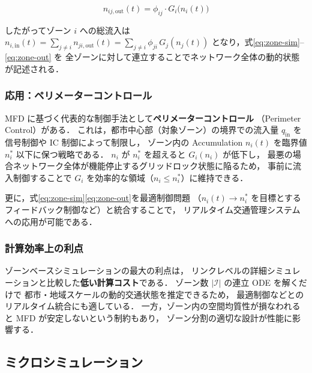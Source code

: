 \begin{equation}
  n_{ij,\text{out}}(t) = \phi_{ij} \cdot G_i\bigl(n_i(t)\bigr)
  \label{eq:zone-out}
\end{equation}

したがってゾーン $i$ への総流入は
$n_{i,\text{in}}(t) = \sum_{j \neq i} n_{ji,\text{out}}(t)
  = \sum_{j \neq i} \phi_{ji}\, G_j(n_j(t))$
となり，式\eqref{eq:zone-sim}--\eqref{eq:zone-out} を
全ゾーンに対して連立することでネットワーク全体の動的状態が記述される．

\subsubsection*{応用：ペリメーターコントロール}

MFD に基づく代表的な制御手法として\textbf{ペリメーターコントロール}
（Perimeter Control）がある\cite{Daganzo2007}．
これは，都市中心部（対象ゾーン）の境界での流入量 $q_{\text{in}}$ を
信号制御や IC 制御によって制限し，
ゾーン内の Accumulation $n_i(t)$ を臨界値 $n_i^*$ 以下に保つ戦略である．
$n_i$ が $n_i^*$ を超えると $G_i(n_i)$ が低下し，
最悪の場合ネットワーク全体が機能停止するグリッドロック状態に陥るため，
事前に流入制御することで $G_i$ を効率的な領域（$n_i \leq n_i^*$）に維持できる．

更に，式\eqref{eq:zone-sim}\eqref{eq:zone-out}を最適制御問題
（$n_i(t) \to n_i^*$ を目標とするフィードバック制御など）と統合することで，
リアルタイム交通管理システムへの応用が可能である．

\subsubsection*{計算効率上の利点}

ゾーンベースシミュレーションの最大の利点は，
リンクレベルの詳細シミュレーションと比較した\textbf{低い計算コスト}である．
ゾーン数 $|\mathcal{I}|$ の連立 ODE を解くだけで
都市・地域スケールの動的交通状態を推定できるため，
最適制御などとのリアルタイム統合にも適している．
一方，ゾーン内の空間均質性が損なわれると MFD が安定しないという制約もあり，
ゾーン分割の適切な設計が性能に影響する．

\subsection{ミクロシミュレーション}
\label{subsec:micro-sim}

